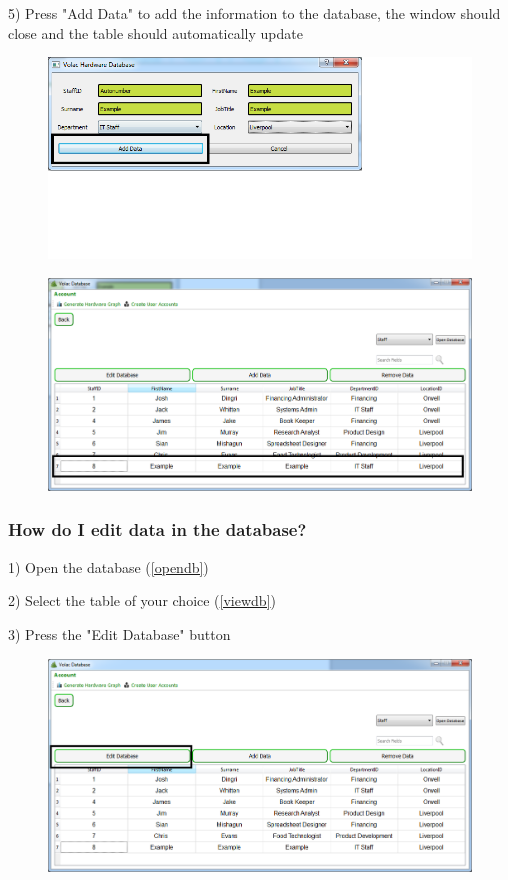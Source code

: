 5) Press "Add Data" to add the information to the database, the window should close and the table should automatically update

\begin{figure}[H]
    \includegraphics[width=\textwidth]{./Manual/Images/adddata3.png}
\end{figure}

\begin{figure}[H]
    \includegraphics[width=\textwidth]{./Manual/Images/adddata4.png}
\end{figure}

\subsubsection{How do I edit data in the database?}

1) Open the database (\ref{opendb})

2) Select the table of your choice (\ref{viewdb})

3) Press the "Edit Database" button 

\begin{figure}[H]
    \includegraphics[width=\textwidth]{./Manual/Images/editdata.png}
\end{figure}

